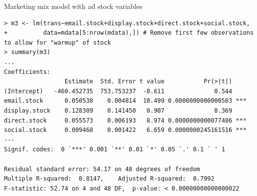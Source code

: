 \documentclass[10pt, aspectratio=169]{beamer}
\begin{document}
\begin{frame}[fragile]{Marketing mix model with ad stock variables}
\begin{lstlisting}
> m3 <- lm(trans~email.stock+display.stock+direct.stock+social.stock, 
+          data=mdata[5:nrow(mdata),]) # Remove first few observations to allow for "warmup" of stock
> summary(m3)
...
Coefficients:
                 Estimate  Std. Error t value           Pr(>|t|)    
(Intercept)   -460.452735  753.753237  -0.611              0.544    
email.stock      0.050538    0.004814  10.499 0.0000000000000503 ***
display.stock    0.128309    0.141450   0.907              0.369    
direct.stock     0.055573    0.006193   8.974 0.0000000000077486 ***
social.stock     0.009468    0.001422   6.659 0.0000000245161516 ***
---
Signif. codes:  0 `***' 0.001 `**' 0.01 `*' 0.05 `.' 0.1 ` ' 1

Residual standard error: 54.17 on 48 degrees of freedom
Multiple R-squared:  0.8147,	Adjusted R-squared:  0.7992 
F-statistic: 52.74 on 4 and 48 DF,  p-value: < 0.00000000000000022
\end{lstlisting}
\end{frame}
\end{document}
